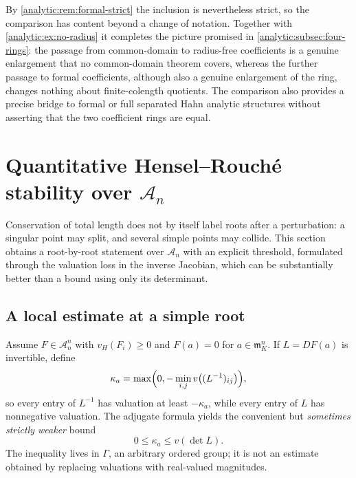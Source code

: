 \documentclass[11pt,letterpaper]{article}
\theoremstyle{definition}
\theoremstyle{remark}
\newcommand{\A}{\mathscr A}
\newcommand{\m}{\mathfrak m}
\newcommand{\vH}{v_{\!H}}
\numberwithin{equation}{section}
\begin{document}
By \cref{analytic:rem:formal-strict} the inclusion is nevertheless strict,
so the comparison has content beyond a change of notation. Together with
\cref{analytic:ex:no-radius} it completes the picture promised in
\cref{analytic:subsec:four-rings}: the passage from common-domain to
radius-free coefficients is a genuine enlargement that no common-domain
theorem covers, whereas the further passage to formal coefficients,
although also a genuine enlargement of the ring, changes nothing about
finite-colength quotients. The comparison also provides a precise bridge to
formal or full separated Hahn analytic structures without asserting that the
two coefficient rings are equal.

\section{Quantitative Hensel--Rouch\'e stability over $\A_n$}
\label{analytic:sec:stability}

Conservation of total length does not by itself label roots after a
perturbation: a singular point may split, and several simple points may
collide. This section obtains a root-by-root statement over $\A_n$ with an
explicit threshold, formulated through the valuation loss in the inverse
Jacobian, which can be substantially better than a bound using only its
determinant.

\subsection{A local estimate at a simple root}
Assume $F\in\A_n^n$ with $\vH(F_i)\ge0$ and $F(a)=0$ for $a\in\m_K^n$. If
$L=DF(a)$ is invertible, define
\begin{equation}\label{analytic:eq:kappa}
 \kappa_a=\max\Bigl(0,-\min_{i,j}v\bigl((L^{-1})_{ij}\bigr)\Bigr),
\end{equation}
so every entry of $L^{-1}$ has valuation at least $-\kappa_a$, while every
entry of $L$ has nonnegative valuation. The adjugate formula yields the
convenient but \emph{sometimes strictly weaker} bound
\begin{equation}\label{analytic:eq:det-bound}
 0\le\kappa_a\le v(\det L).
\end{equation}
The inequality lives in $\Gamma$, an arbitrary ordered group; it is not an
estimate obtained by replacing valuations with real-valued magnitudes.
\end{document}
